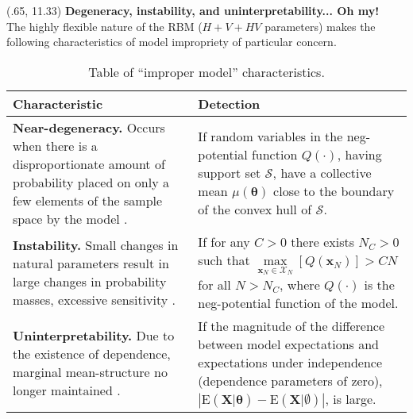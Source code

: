 \documentclass[extrafontsizes, 30pt]{memoir}
\begin{document}
\begin{textblock}{14}(.65, 11.33)
{\large \bfseries Degeneracy, instability, and uninterpretability... Oh my!}\\[-1cm]

The highly flexible nature of the RBM ($H + V + HV$ parameters) makes the following characteristics of model impropriety of particular concern. \\[-.5cm]

\begin{table}
\centering
\begin{tabular}{| p{.48\linewidth} | p{.5\linewidth} |}
\hline
Characteristic & Detection \\
\hline
\hline
{\bfseries Near-degeneracy.} Occurs when there is a disproportionate amount of probability placed on only a few elements of the sample space by the model \cite{handcock2003assessing}. & If random variables in the neg-potential function $Q(\cdot)$, having support set $\mathcal{S}$, have a collective mean $\mu(\boldsymbol \theta)$ close to the boundary of the convex hull of $\mathcal{S}$. \\
\hline
{\bfseries Instability.} Small changes in natural parameters result in large changes in probability masses, excessive sensitivity \cite{schweinberger2011instability}. & If for any $C > 0$ there exists $N_C > 0$ such that 
$\max\limits_{\boldsymbol x_N \in \mathcal{X}_N}[Q(\boldsymbol x_N)] > CN$ for all $N > N_C$, where $Q(\cdot)$ is the neg-potential function of the model. \\
\hline
{\bfseries Uninterpretability.} Due to the existence of dependence, marginal mean-structure no longer maintained \cite{kaiser2007statistical}. & If the magnitude of the difference between model expectations and expectations under independence (dependence parameters of zero), $\left|\text{E}(\boldsymbol X | \boldsymbol \theta) - \text{E}(\boldsymbol X | \emptyset ) \right|$, is large.\\
\hline
\end{tabular}
\label{tab:degen}
\caption{Table of ``improper model'' characteristics.}
\end{table}
\end{textblock}
\end{document}
